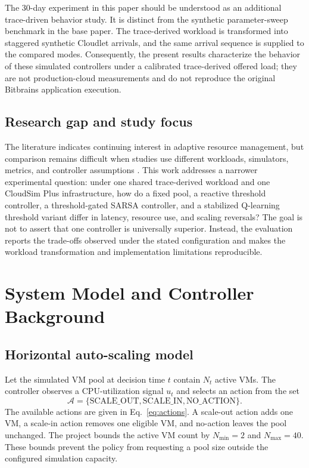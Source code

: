 \documentclass[pdflatex,sn-mathphys-num]{sn-jnl}
\begin{document}
The 30-day experiment in this paper should be understood as an additional trace-driven behavior study. It is distinct from the synthetic parameter-sweep benchmark in the base paper. The trace-derived workload is transformed into staggered synthetic Cloudlet arrivals, and the same arrival sequence is supplied to the compared modes. Consequently, the present results characterize the behavior of these simulated controllers under a calibrated trace-derived offered load; they are not production-cloud measurements and do not reproduce the original Bitbrains application execution.

\subsection{Research gap and study focus}

The literature indicates continuing interest in adaptive resource management, but comparison remains difficult when studies use different workloads, simulators, metrics, and controller assumptions \cite{qu2018autoscaling,machiraju2026survey}. This work addresses a narrower experimental question: under one shared trace-derived workload and one CloudSim Plus infrastructure, how do a fixed pool, a reactive threshold controller, a threshold-gated SARSA controller, and a stabilized Q-learning threshold variant differ in latency, resource use, and scaling reversals? The goal is not to assert that one controller is universally superior. Instead, the evaluation reports the trade-offs observed under the stated configuration and makes the workload transformation and implementation limitations reproducible.

\section{System Model and Controller Background}\label{sec:background}

\subsection{Horizontal auto-scaling model}

Let the simulated VM pool at decision time $t$ contain $N_t$ active VMs. The controller observes a CPU-utilization signal $u_t$ and selects an action from the set
\begin{equation}
  \mathcal{A}=\{\text{SCALE\_OUT},\text{SCALE\_IN},\text{NO\_ACTION}\}.
  \label{eq:actions}
\end{equation}
The available actions are given in Eq.~\ref{eq:actions}. A scale-out action adds one VM, a scale-in action removes one eligible VM, and no-action leaves the pool unchanged. The project bounds the active VM count by $N_{\min}=2$ and $N_{\max}=40$. These bounds prevent the policy from requesting a pool size outside the configured simulation capacity.
\end{document}
